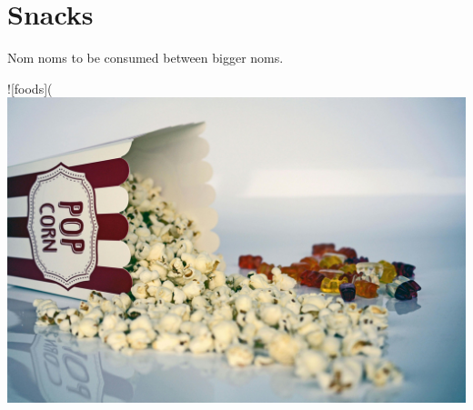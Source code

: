 \chapter{Snacks}

Nom noms to be consumed between bigger noms.

![foods](
\centering
\includegraphics{images/popcorn-cinema-ticket-film-122434.jpg}